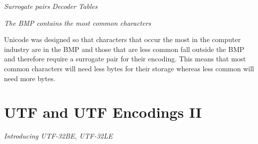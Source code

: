 





\frmrule 

\textit{Surrogate pairs Decoder Tables}




\frmrule 

\textit{The BMP contains the most common characters}

Unicode was designed so that characters that occur the most in the computer 
industry are in the BMP and those that are less common fall outside the BMP 
and therefore require a surrogate pair for their encoding. This means 
that most common characters will need less bytes for their storage
whereas less common will need more bytes. 






\section{UTF and UTF Encodings II}


\frmrule 

\textit{Introducing UTF-32BE, UTF-32LE}


